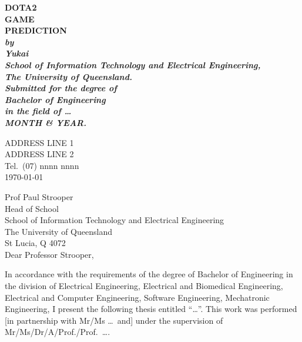\documentclass[12pt,openany,a4paper]{book}
\renewcommand{\baselinestretch}{1.2}	%
\begin{document}
\frontmatter

\begin{titlepage}
\renewcommand{\baselinestretch}{1.0}
\begin{center}
\vspace*{35mm}
\Huge\bf
		DOTA2\\
		GAME\\
		PREDICTION\\
\vspace{20mm}
\large\sl
		by\\
		Yukai
		\medskip\\
\rm
		School of Information Technology and Electrical Engineering,\\
		The University of Queensland.\\
\vspace{30mm}
		Submitted for the degree of\\
		Bachelor of Engineering
		\smallskip\\
\normalsize
		in the field of \ldots
		\medskip\\
\large
		MONTH \& YEAR.		
\end{center}
\end{titlepage}

\cleardoublepage

\begin{flushright}
	ADDRESS LINE 1\\
	ADDRESS LINE 2\\
	Tel.\ (07) nnnn nnnn\\
	\medskip
	\today
\end{flushright}
\begin{flushleft}
  Prof Paul Strooper\\
  Head of School\\
  School of Information Technology and Electrical Engineering\\
  The University of Queensland\\
  St Lucia, Q 4072\\
  \bigskip\bigskip
  Dear Professor Strooper,
\end{flushleft}

In accordance with the requirements of the degree of Bachelor of
Engineering in the division of 
Electrical Engineering,
Electrical and Biomedical Engineering,
Electrical and Computer Engineering,
Software Engineering,
Mechatronic Engineering,
I present the
following thesis entitled ``\ldots''.  This work was performed [in
partnership with Mr/Ms \ldots\ and] under the supervision of
Mr/Ms/Dr/A/Prof./Prof.~\ldots.
\end{document}

